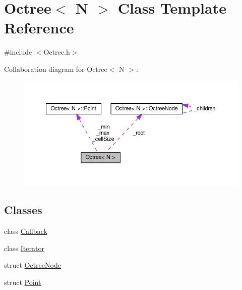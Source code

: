 \hypertarget{classOctree}{}\section{Octree$<$ N $>$ Class Template Reference}
\label{classOctree}


{\ttfamily \#include $<$Octree.\+h$>$}



Collaboration diagram for Octree$<$ N $>$\+:
\nopagebreak
\begin{figure}[H]
\begin{center}
\leavevmode
\includegraphics[width=350pt]{classOctree__coll__graph}
\end{center}
\end{figure}
\subsection*{Classes}
\begin{DoxyCompactItemize}
\item 
class \hyperlink{classOctree_1_1Callback}{Callback}
\item 
class \hyperlink{classOctree_1_1Iterator}{Iterator}
\item 
struct \hyperlink{structOctree_1_1OctreeNode}{Octree\+Node}
\item 
struct \hyperlink{structOctree_1_1Point}{Point}
\end{DoxyCompactItemize}

